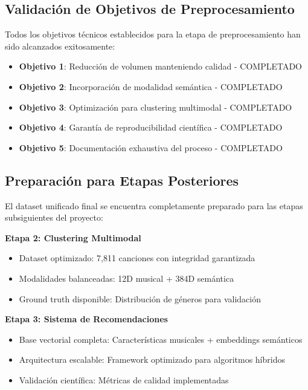 \documentclass[12pt,a4paper]{report}
\begin{document}
\subsection{Validación de Objetivos de Preprocesamiento}

Todos los objetivos técnicos establecidos para la etapa de preprocesamiento han sido alcanzados exitosamente:

\begin{itemize}[leftmargin=*]
    \item[\checkmark] \textbf{Objetivo 1}: Reducción de volumen manteniendo calidad - COMPLETADO
    \item[\checkmark] \textbf{Objetivo 2}: Incorporación de modalidad semántica - COMPLETADO  
    \item[\checkmark] \textbf{Objetivo 3}: Optimización para clustering multimodal - COMPLETADO
    \item[\checkmark] \textbf{Objetivo 4}: Garantía de reproducibilidad científica - COMPLETADO
    \item[\checkmark] \textbf{Objetivo 5}: Documentación exhaustiva del proceso - COMPLETADO
\end{itemize}

\subsection{Preparación para Etapas Posteriores}

El dataset unificado final se encuentra completamente preparado para las etapas subsiguientes del proyecto:

\textbf{Etapa 2: Clustering Multimodal}
\begin{itemize}[leftmargin=*]
    \item Dataset optimizado: 7,811 canciones con integridad garantizada
    \item Modalidades balanceadas: 12D musical + 384D semántica
    \item Ground truth disponible: Distribución de géneros para validación
\end{itemize}

\textbf{Etapa 3: Sistema de Recomendaciones}
\begin{itemize}[leftmargin=*]
    \item Base vectorial completa: Características musicales + embeddings semánticos
    \item Arquitectura escalable: Framework optimizado para algoritmos híbridos
    \item Validación científica: Métricas de calidad implementadas
\end{itemize}
\end{document}
